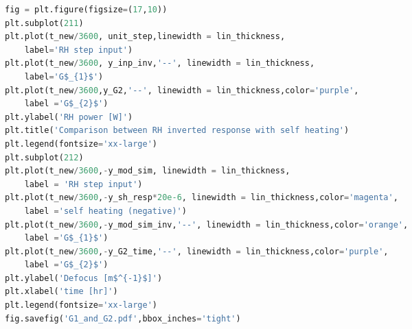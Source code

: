 \begin{spacing}{1.2} \begin{lstlisting}[frame=single,language=Python]
fig = plt.figure(figsize=(17,10))
plt.subplot(211)
plt.plot(t_new/3600, unit_step,linewidth = lin_thickness,
    label='RH step input')
plt.plot(t_new/3600, y_inp_inv,'--', linewidth = lin_thickness,
    label='G$_{1}$')
plt.plot(t_new/3600,y_G2,'--', linewidth = lin_thickness,color='purple',
    label ='G$_{2}$')
plt.ylabel('RH power [W]')
plt.title('Comparison between RH inverted response with self heating')
plt.legend(fontsize='xx-large')
plt.subplot(212)
plt.plot(t_new/3600,-y_mod_sim, linewidth = lin_thickness,
    label = 'RH step input')
plt.plot(t_new/3600,-y_sh_resp*20e-6, linewidth = lin_thickness,color='magenta',
    label ='self heating (negative)')
plt.plot(t_new/3600,-y_mod_sim_inv,'--', linewidth = lin_thickness,color='orange',
    label ='G$_{1}$')
plt.plot(t_new/3600,-y_G2_time,'--', linewidth = lin_thickness,color='purple',
    label ='G$_{2}$')
plt.ylabel('Defocus [m$^{-1}$]')
plt.xlabel('time [hr]')
plt.legend(fontsize='xx-large')
fig.savefig('G1_and_G2.pdf',bbox_inches='tight')
\end{lstlisting} \end{spacing}

